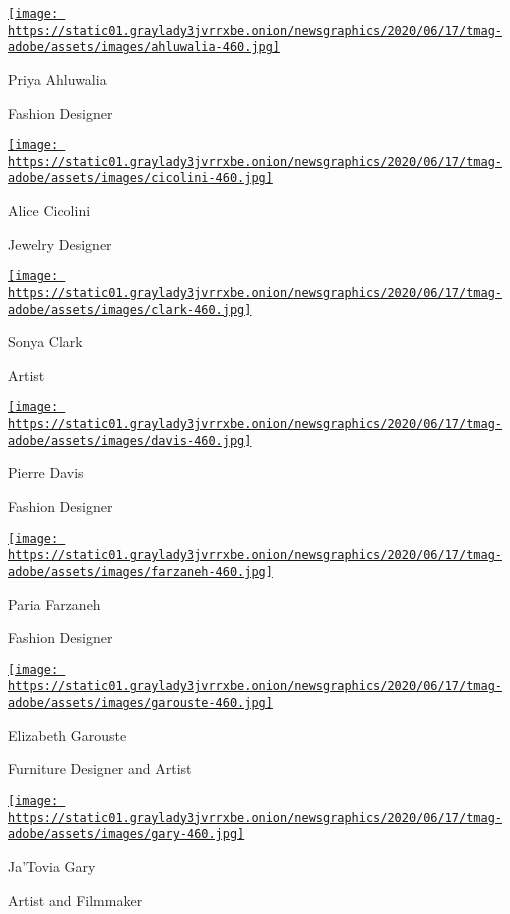 \href{https://www.nytimes3xbfgragh.onion/2020/08/10/t-magazine/priya-ahluwalia-fashion-menswear.html}{\texttt{[image: https://static01.graylady3jvrrxbe.onion/newsgraphics/2020/06/17/tmag-adobe/assets/images/ahluwalia-460.jpg]}}

Priya Ahluwalia

Fashion Designer

\href{https://www.nytimes3xbfgragh.onion/2020/08/10/t-magazine/alice-cicolini-jewelry-art.html}{\texttt{[image: https://static01.graylady3jvrrxbe.onion/newsgraphics/2020/06/17/tmag-adobe/assets/images/cicolini-460.jpg]}}

Alice Cicolini

Jewelry Designer

\href{https://nytimes3xbfgragh.onion/2020/08/10/t-magazine/sonya-clark-flags-art.html}{\texttt{[image: https://static01.graylady3jvrrxbe.onion/newsgraphics/2020/06/17/tmag-adobe/assets/images/clark-460.jpg]}}

Sonya Clark

Artist

\href{https://www.nytimes3xbfgragh.onion/2020/08/10/t-magazine/pierre-davis-no-sesso.html}{\texttt{[image: https://static01.graylady3jvrrxbe.onion/newsgraphics/2020/06/17/tmag-adobe/assets/images/davis-460.jpg]}}

Pierre Davis

Fashion Designer

\href{https://www.nytimes3xbfgragh.onion/2020/08/10/t-magazine/paria-farzaneh-fashion-menswear.html}{\texttt{[image: https://static01.graylady3jvrrxbe.onion/newsgraphics/2020/06/17/tmag-adobe/assets/images/farzaneh-460.jpg]}}

Paria Farzaneh

Fashion Designer

\href{https://www.nytimes3xbfgragh.onion/2020/08/10/t-magazine/elizabeth-garouste-interior-design.html}{\texttt{[image: https://static01.graylady3jvrrxbe.onion/newsgraphics/2020/06/17/tmag-adobe/assets/images/garouste-460.jpg]}}

Elizabeth Garouste

Furniture Designer and Artist

\href{https://www.nytimes3xbfgragh.onion/2020/08/10/t-magazine/jatovia-gary-film.html}{\texttt{[image: https://static01.graylady3jvrrxbe.onion/newsgraphics/2020/06/17/tmag-adobe/assets/images/gary-460.jpg]}}

Ja'Tovia Gary

Artist and Filmmaker

